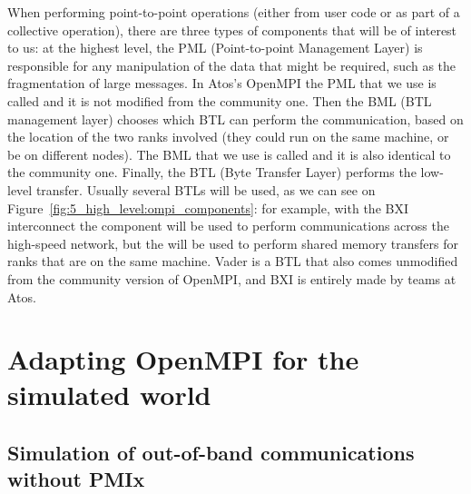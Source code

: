 When performing point-to-point operations (either from user code or as part of a
collective operation), there are three types of components that will be of
interest to us: at the highest level, the PML (Point-to-point Management Layer)
is responsible for any manipulation of the data that might be required, such as
the fragmentation of large messages. In Atos's OpenMPI the PML that we use is
called  and it is not modified from the community one. Then the BML
(BTL management layer) chooses which BTL can perform the communication, based on
the location of the two ranks involved (they could run on the same machine, or
be on different nodes). The BML that we use is called  and it is also
identical to the community one. Finally, the BTL (Byte Transfer Layer) performs
the low-level transfer. Usually several BTLs will be used, as we can see on
Figure~\ref{fig:5_high_level:ompi_components}: for example, with the BXI
interconnect the  component will be used to perform
communications across the high-speed network, but the  will be
used to perform shared memory transfers for ranks that are on the same machine.
Vader is a BTL that also comes unmodified from the community version of OpenMPI,
and BXI is entirely made by teams at Atos.

\section{Adapting OpenMPI for the simulated world}

\subsection{Simulation of out-of-band communications without PMIx}

